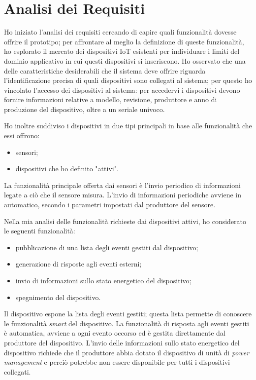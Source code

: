 \newpage

\section{Analisi dei Requisiti}
\label{ar}

Ho iniziato l'analisi dei requisiti cercando di capire quali funzionalità dovesse offrire il prototipo; per affrontare al meglio la definizione di queste funzionalità, ho esplorato il mercato dei dispositivi IoT esistenti per individuare i limiti del dominio applicativo in cui questi dispositivi si inseriscono.
Ho osservato che una delle caratteristiche desiderabili che il sistema deve offrire riguarda l'identificazione precisa di quali dispositivi sono collegati al sistema; per questo ho vincolato l'accesso dei dispositivi al sistema: per accedervi i dispositivi devono fornire informazioni relative a modello, revisione, produttore e anno di produzione del dispositivo, oltre a un seriale univoco.

Ho inoltre suddiviso i dispositivi in due tipi principali in base alle funzionalità che essi offrono:
\begin{itemize}
	\item sensori;
	\item dispositivi che ho definito "attivi".
\end{itemize}
La funzionalità principale offerta dai sensori è l'invio periodico di informazioni legate a ciò che il sensore misura.
L'invio di informazioni periodiche avviene in automatico, secondo i parametri impostati dal produttore del sensore.

Nella mia analisi delle funzionalità richieste dai dispositivi attivi, ho considerato le seguenti funzionalità:
\begin{itemize}
	\item pubblicazione di una lista degli eventi gestiti dal dispositivo;
	\item generazione di risposte agli eventi esterni;
	\item invio di informazioni sullo stato energetico del dispositivo;
	\item spegnimento del dispositivo.
\end{itemize}

Il dispositivo espone la lista degli eventi gestiti; questa lista permette di conoscere le funzionalità \emph{smart} del dispositivo.
La funzionalità di risposta agli eventi gestiti è automatica, avviene a ogni evento occorso ed è gestita direttamente dal produttore del dispositivo.
L'invio delle informazioni sullo stato energetico del dispositivo richiede che il produttore abbia dotato il dispositivo di unità di \emph{power management} e perciò potrebbe non essere disponibile per tutti i dispositivi collegati.

